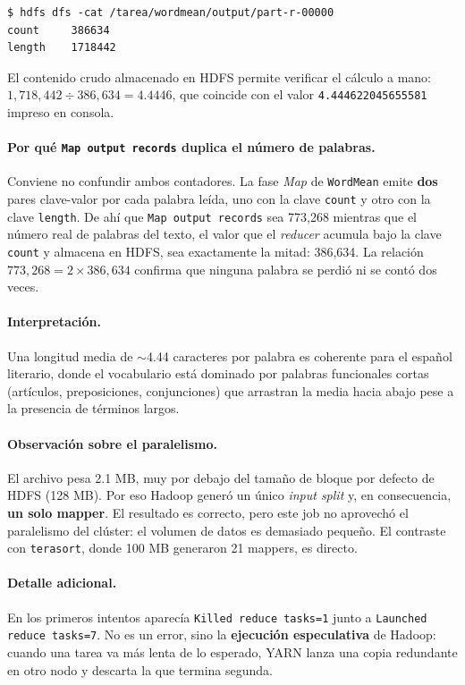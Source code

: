 \begin{lstlisting}[style=sh]
$ hdfs dfs -cat /tarea/wordmean/output/part-r-00000
count     386634
length    1718442
\end{lstlisting}

El contenido crudo almacenado en HDFS permite verificar el cálculo a mano: $1{,}718{,}442 \div 386{,}634 = 4.4446$, que coincide con el valor \texttt{4.444622045655581} impreso en consola.

\paragraph{Por qué \texttt{Map output records} duplica el número de palabras.} Conviene no confundir ambos contadores. La fase \textit{Map} de \texttt{WordMean} emite \textbf{dos} pares clave-valor por cada palabra leída, uno con la clave \texttt{count} y otro con la clave \texttt{length}. De ahí que \texttt{Map output records} sea 773,268 mientras que el número real de palabras del texto, el valor que el \textit{reducer} acumula bajo la clave \texttt{count} y almacena en HDFS, sea exactamente la mitad: 386,634. La relación $773{,}268 = 2 \times 386{,}634$ confirma que ninguna palabra se perdió ni se contó dos veces.

\paragraph{Interpretación.} Una longitud media de $\sim$4.44 caracteres por palabra es coherente para el español literario, donde el vocabulario está dominado por palabras funcionales cortas (artículos, preposiciones, conjunciones) que arrastran la media hacia abajo pese a la presencia de términos largos.

\paragraph{Observación sobre el paralelismo.} El archivo pesa 2.1 MB, muy por debajo del tamaño de bloque por defecto de HDFS (128 MB). Por eso Hadoop generó un único \textit{input split} y, en consecuencia, \textbf{un solo mapper}. El resultado es correcto, pero este job no aprovechó el paralelismo del clúster: el volumen de datos es demasiado pequeño. El contraste con \texttt{terasort}, donde 100 MB generaron 21 mappers, es directo.

\paragraph{Detalle adicional.} En los primeros intentos aparecía \texttt{Killed reduce tasks=\bk{}1} junto a \texttt{Launched reduce tasks=\bk{}7}. No es un error, sino la \textbf{ejecución especulativa} de Hadoop: cuando una tarea va más lenta de lo esperado, YARN lanza una copia redundante en otro nodo y descarta la que termina segunda.

